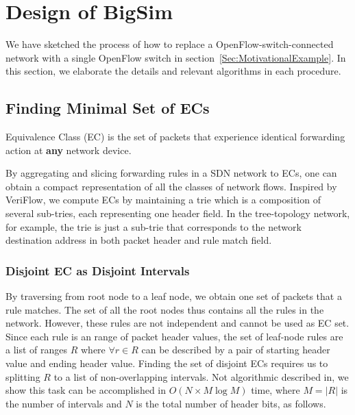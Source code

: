 \section{Design of BigSim}

We have sketched the process of how to replace a OpenFlow-switch-connected network
with a single OpenFlow switch in section~\ref{Sec:MotivationalExample}.
In this section, we elaborate the details and relevant algorithms
in each procedure.

\subsection{Finding Minimal Set of ECs}

\begin{definition}
Equivalence Class (EC) is the set of packets that
experience identical forwarding action at \textbf{any} network device.
\end{definition}

By aggregating and slicing forwarding rules in a SDN network to ECs,
one can obtain a compact representation of all the classes of network flows.
Inspired by VeriFlow\cite{Veriflow}, we compute ECs by maintaining a trie
which is a composition of several sub-tries, each representing one header field.
In the tree-topology network, for example, the trie is just a sub-trie that
corresponds to the network destination address in both packet header and rule match field.

\subsubsection{Disjoint EC as Disjoint Intervals}
By traversing from root node to a leaf node, we obtain one set of packets
that a rule matches.
The set of all the root nodes thus contains all the rules in the network.
However, these rules are not independent and cannot be used as EC set.
Since each rule is an range of packet header values,
the set of leaf-node rules are a list of ranges $R$ where $\forall r \in R$ can be
described by a pair of starting header value and ending header value.
Finding the set of disjoint ECs requires us to splitting $R$ to
a list of non-overlapping intervals.
Not algorithmic described in\cite{Veriflow},
we show this task can be accomplished in $O(N \times M\log M)$ time,
where $M=|R|$ is the number of intervals and $N$ is the total number of header bits,
as follows\cite{SplitDisjointInterval}.

